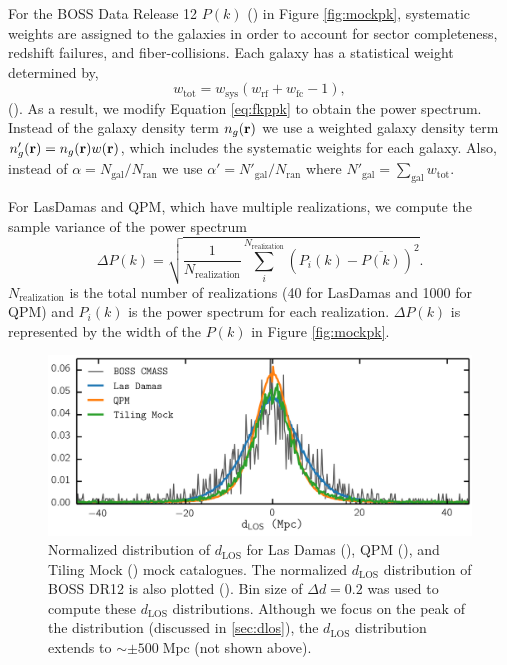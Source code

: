 \documentclass{emulateapj}
\begin{document}
For the BOSS Data Release 12 $P(k)$ (\cmasscolor) in Figure \ref{fig:mockpk}, systematic weights are assigned to the galaxies in order to account for sector completeness, redshift failures, and fiber-collisions. Each galaxy has a statistical weight determined by, 
\begin{equation} \label{eq:weight}
w_\mathrm{tot} = w_\mathrm{sys} (w_\mathrm{rf} + w_\mathrm{fc} -1), 
\end{equation} 
(\citealt{Anderson:2012aa, Beutler:2014aa}). As a result, we modify Equation \ref{eq:fkppk} to obtain the power spectrum. Instead of the galaxy density term $n_g({\bf r})$ we use a weighted galaxy density term $n'_g({\bf r}) = n_g({\bf r}) w({\bf r})$, which includes the systematic weights for each galaxy. Also, instead of $\alpha = N_{\mathrm{gal}}/N_\mathrm{ran}$ we use $\alpha ' = N'_\mathrm{gal}/N_\mathrm{ran}$ where $N'_\mathrm{gal} = \sum_\mathrm{gal} w_\mathrm{tot}$. 

For LasDamas and QPM, which have multiple realizations, we compute the sample variance of the power spectrum
\begin{equation} \label{eq:pk_var}
\Delta P (k)= \sqrt{\frac{1}{N_\mathrm{realization}} \sum\limits_i^{N_\mathrm{realization}} (P_i(k)- \overline{P(k)})^2 }. 
\end{equation}
$N_\mathrm{realization}$ is the total number of realizations (40 for LasDamas and 1000 for QPM) and $P_i(k)$ is the power spectrum for each realization. $\Delta P(k)$ is represented by the width of the $P(k)$ in Figure \ref{fig:mockpk}. 

\begin{figure}
\begin{center}
\includegraphics[scale=0.575]{fcpaper_dlos_dist.png}
\caption{Normalized distribution of $d_{\mathrm{LOS}}$ for Las Damas (\ldgcolor), QPM (\qpmcolor), and Tiling Mock (\tmcolor) mock catalogues. The normalized $d_{\mathrm{LOS}}$ distribution of BOSS DR12 is also plotted (\cmasscolor). Bin size of $\Delta d = 0.2$ was used to compute these $d_{\mathrm{LOS}}$ distributions. Although we focus on the peak of the distribution (discussed in \ref{sec:dlos}), the $d_\mathrm{LOS}$ distribution extends to $\sim \pm 500 \; \mathrm{Mpc}$ (not shown above).} \label{fig:d_los}
\end{center}
\end{figure}
\end{document}

